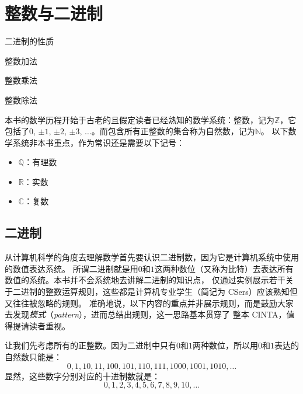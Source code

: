 
\chapter{整数与二进制}
\label{chap:int}

\begin{introduction}
  \item 二进制的性质
  \item 整数加法
  \item 整数乘法
  \item 整数除法
\end{introduction}

本书的数学历程开始于古老的且假定读者已经熟知的数学系统：整数，记为$\mathbb{Z}$，它包括了$0$, $\pm 1$, $\pm 2$, $\pm 3$, $\ldots$。而包含所有正整数的集合称为自然数，记为$\mathbb{N}$。 以下数学系统非本书重点，作为常识还是需要以下记号：
\begin{itemize}
\item $\mathbb{Q}$：有理数

\item $\mathbb{R}$：实数

\item $\mathbb{C}$：复数
\end{itemize}

\section{二进制}
\label{sec:binary}
从计算机科学的角度去理解数学首先要认识二进制数，因为它是计算机系统中使用的数值表达系统。
所谓二进制就是用$0$和$1$这两种数位（又称为比特）去表达所有数值的系统。本书并不会系统地去讲解二进制的知识点，
仅通过实例展示若干关于二进制的整数运算规则，这些都是计算机专业学生（简记为 CSers）应该熟知但又往往被忽略的规则。
准确地说，以下内容的重点并非展示规则，而是鼓励大家去发现\emph{模式}（\emph{pattern}），进而总结出规则，这一思路基本贯穿了
整本 CINTA，值得提请读者重视。

让我们先考虑所有的正整数。因为二进制中只有$0$和$1$两种数位，所以用$0$和$1$表达的自然数只能是：
\[0, 1, 10, 11, 100, 101, 110, 111, 1000, 1001, 1010, \ldots \]
显然，这些数字分别对应的十进制数就是：
\[0, 1, 2, 3, 4, 5, 6, 7, 8, 9, 10, \ldots\]

